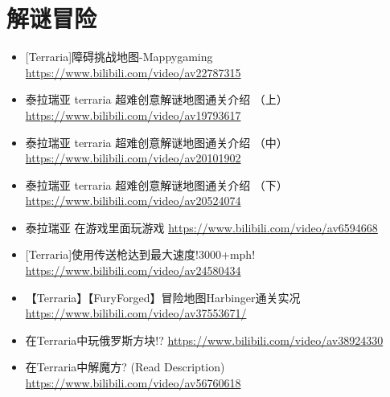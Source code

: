 \section{解谜冒险}
\begin{itemize}
\item {[}Terraria]障碍挑战地图-Mappygaming \url{https://www.bilibili.com/video/av22787315}
\item 泰拉瑞亚 terraria 超难创意解谜地图通关介绍 （上） \url{https://www.bilibili.com/video/av19793617}
\item 泰拉瑞亚 terraria 超难创意解谜地图通关介绍 （中） \url{https://www.bilibili.com/video/av20101902}
\item 泰拉瑞亚 terraria 超难创意解谜地图通关介绍 （下） \url{https://www.bilibili.com/video/av20524074}
\item 泰拉瑞亚 在游戏里面玩游戏 \url{https://www.bilibili.com/video/av6594668}
\item {[}Terraria]使用传送枪达到最大速度!3000+mph! \url{https://www.bilibili.com/video/av24580434}
\item【Terraria】【FuryForged】冒险地图Harbinger通关实况 \url{https://www.bilibili.com/video/av37553671/}
\item 在Terraria中玩俄罗斯方块!? \url{https://www.bilibili.com/video/av38924330}
\item 在Terraria中解魔方? (Read Description) \url{https://www.bilibili.com/video/av56760618}
\end{itemize}

